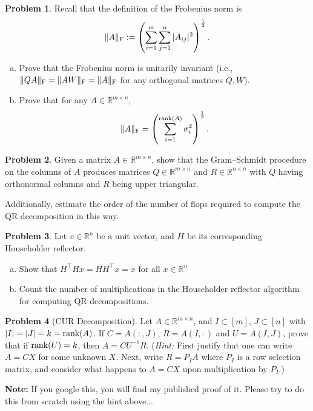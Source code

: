 \documentclass{amsart}[11pt]
\theoremstyle{definition}
\newtheorem{problem}{Problem}
\newcommand{\R}{\mathbb{R}}
\newcommand{\rank}{\textnormal{rank}}
\newcommand{\fro}{\textnormal{F}}
\begin{document}

\begin{problem}
Recall that the definition of the Frobenius norm is \[\|A\|_{\fro}:=\left(\sum_{i=1}^m\sum_{j=1}^n|A_{ij}|^2\right)^\frac12.\]
\begin{enumerate}[(a)]
\item Prove that the Frobenius norm is unitarily invariant (i.e., $\|QA\|_{\fro} = \|AW\|_{\fro} = \|A\|_{\fro}$ for any orthogonal matrices $Q,W$). \item Prove that for any $A\in\R^{m\times n}$,
 \[\|A\|_{\fro} = \left(\sum_{i=1}^{\rank(A)} \sigma_i^2\right)^\frac12.\]
\end{enumerate}
\end{problem}


\begin{problem}
Given a matrix $A\in\R^{m\times n}$, show that the Gram--Schmidt procedure on the columns of $A$ produces matrices $Q\in\R^{m\times n}$ and $R\in\R^{n\times n}$ with $Q$ having orthonormal columns and $R$ being upper triangular.

Additionally, estimate the order of the number of flops required to compute the QR decomposition in this way.		
\end{problem}

\begin{problem}
Let $v\in\R^n$ be a unit vector, and $H$ be its corresponding Householder reflector. 
\begin{enumerate}[(a)]
\item Show that $H^\top Hx = HH^\top x = x$ for all $x\in\R^n$
\item Count the number of multiplications in the Householder reflector algorithm for computing QR decompositions.
\end{enumerate}
\end{problem}

\begin{problem}[CUR Decomposition]\label{PROB:CUREasy}
Let $A\in\R^{m\times n}$, and $I\subset[m]$, $J\subset[n]$ with $|I|=|J|=k=\textnormal{rank}(A)$.  If $C=A(:,J)$, $R=A(I,:)$ and $U=A(I,J)$, prove that if $\rank(U)=k$, then $A=CU^{-1}R$.  (\textit{Hint:} First justify that one can write $A=CX$ for some unknown $X$. Next, write $R=P_IA$ where $P_I$ is a row selection matrix, and consider what happens to $A=CX$ upon multiplication by $P_I$.)

\textbf{Note:} If you google this, you will find my published proof of it. Please try to do this from scratch using the hint above... 
\end{problem}
\end{document}

